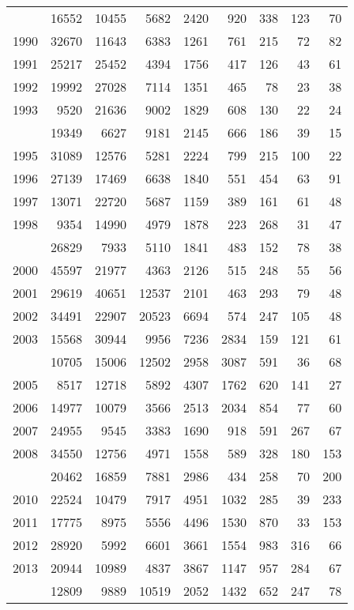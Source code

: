 \documentclass[
]{article}
\begin{document}
\begin{longtable}[t]{lrrrrrrrr}
\endfoot
\bottomrule
\endlastfoot
1989 & 16552 & 10455 & 5682 & 2420 & 920 & 338 & 123 & 70\\
1990 & 32670 & 11643 & 6383 & 1261 & 761 & 215 & 72 & 82\\
1991 & 25217 & 25452 & 4394 & 1756 & 417 & 126 & 43 & 61\\
1992 & 19992 & 27028 & 7114 & 1351 & 465 & 78 & 23 & 38\\
1993 & 9520 & 21636 & 9002 & 1829 & 608 & 130 & 22 & 24\\
\addlinespace
1994 & 19349 & 6627 & 9181 & 2145 & 666 & 186 & 39 & 15\\
1995 & 31089 & 12576 & 5281 & 2224 & 799 & 215 & 100 & 22\\
1996 & 27139 & 17469 & 6638 & 1840 & 551 & 454 & 63 & 91\\
1997 & 13071 & 22720 & 5687 & 1159 & 389 & 161 & 61 & 48\\
1998 & 9354 & 14990 & 4979 & 1878 & 223 & 268 & 31 & 47\\
\addlinespace
1999 & 26829 & 7933 & 5110 & 1841 & 483 & 152 & 78 & 38\\
2000 & 45597 & 21977 & 4363 & 2126 & 515 & 248 & 55 & 56\\
2001 & 29619 & 40651 & 12537 & 2101 & 463 & 293 & 79 & 48\\
2002 & 34491 & 22907 & 20523 & 6694 & 574 & 247 & 105 & 48\\
2003 & 15568 & 30944 & 9956 & 7236 & 2834 & 159 & 121 & 61\\
\addlinespace
2004 & 10705 & 15006 & 12502 & 2958 & 3087 & 591 & 36 & 68\\
2005 & 8517 & 12718 & 5892 & 4307 & 1762 & 620 & 141 & 27\\
2006 & 14977 & 10079 & 3566 & 2513 & 2034 & 854 & 77 & 60\\
2007 & 24955 & 9545 & 3383 & 1690 & 918 & 591 & 267 & 67\\
2008 & 34550 & 12756 & 4971 & 1558 & 589 & 328 & 180 & 153\\
\addlinespace
2009 & 20462 & 16859 & 7881 & 2986 & 434 & 258 & 70 & 200\\
2010 & 22524 & 10479 & 7917 & 4951 & 1032 & 285 & 39 & 233\\
2011 & 17775 & 8975 & 5556 & 4496 & 1530 & 870 & 33 & 153\\
2012 & 28920 & 5992 & 6601 & 3661 & 1554 & 983 & 316 & 66\\
2013 & 20944 & 10989 & 4837 & 3867 & 1147 & 957 & 284 & 67\\
\addlinespace
2014 & 12809 & 9889 & 10519 & 2052 & 1432 & 652 & 247 & 78\\

\end{longtable}
\end{document}
